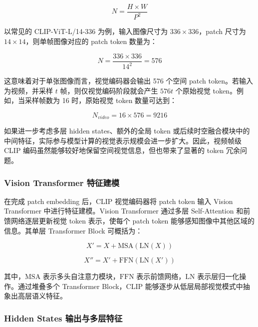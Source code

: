 \begin{equation}
    \label{equ:patch_number}
    N=\frac{H\times W}{P^2}
\end{equation}

以常见的 CLIP-ViT-L/14-336 为例，输入图像尺寸为 $336\times336$，patch 尺寸为 $14\times14$，则单帧图像对应的 patch token 数量为：

\begin{equation}
    \label{equ:clip_patch_number}
    N=\frac{336\times336}{14^2}=576
\end{equation}

这意味着对于单张图像而言，视觉编码器会输出 576 个空间 patch token。若输入为视频，并采样 $t$ 帧，则仅视觉编码阶段就会产生 $576t$ 个原始视觉 token。例如，当采样帧数为 16 时，原始视觉 token 数量可达到：

\begin{equation}
    \label{equ:clip_video_token_number}
    N_{video}=16\times576=9216
\end{equation}

如果进一步考虑多层 hidden states、额外的全局 token 或后续时空融合模块中的中间特征，实际参与模型计算的视觉表示规模会进一步扩大。因此，视频帧级 CLIP 编码虽然能够较好地保留空间视觉信息，但也带来了显著的 token 冗余问题。

\subsubsection{Vision Transformer 特征建模}

在完成 patch embedding 后，CLIP 视觉编码器将 patch token 输入 Vision Transformer 中进行特征建模。Vision Transformer 通过多层 Self-Attention 和前馈网络逐层更新视觉 token 表示，使每个 patch token 能够感知图像中其他区域的信息。其单层 Transformer Block 可概括为：

\begin{equation}
    \label{equ:vit_block_attention}
    X' = X + \mathrm{MSA}(\mathrm{LN}(X))
\end{equation}

\begin{equation}
    \label{equ:vit_block_ffn}
    X'' = X' + \mathrm{FFN}(\mathrm{LN}(X'))
\end{equation}

其中，$\mathrm{MSA}$ 表示多头自注意力模块，$\mathrm{FFN}$ 表示前馈网络，$\mathrm{LN}$ 表示层归一化操作。通过堆叠多个 Transformer Block，CLIP 能够逐步从低层局部视觉模式中抽象出高层语义特征。

\subsubsection{Hidden States 输出与多层特征}

